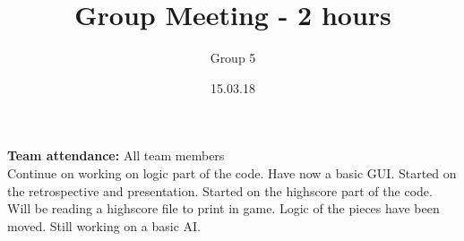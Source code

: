 \documentclass{article}
\title{Group Meeting - 2 hours}
\author{Group 5}
\date{15.03.18}
\begin{document}
	\maketitle
	\noindent
	\textbf{Team attendance:} All team members \\

	\noindent
	Continue on working on logic part of the code. Have now a basic GUI. Started on the retrospective and presentation.
	Started on the highscore part of the code. Will be reading a highscore file to print in game. Logic of the pieces have been moved.
	Still working on a basic AI. 
\end{document}
